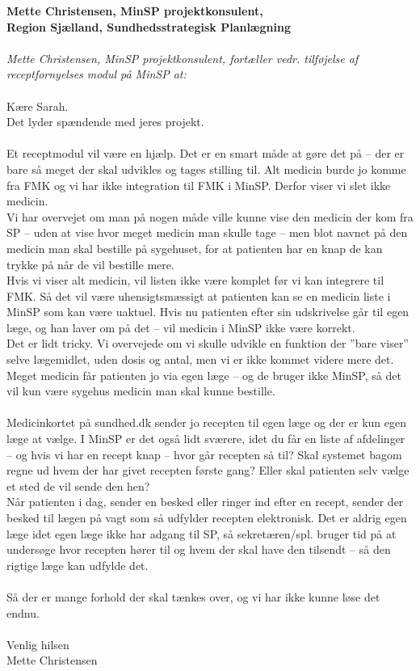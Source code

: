 \textbf{Mette Christensen, MinSP projektkonsulent, \\
	Region Sjælland, Sundhedsstrategisk Planlægning}\\\\
\textit{Mette Christensen, MinSP projektkonsulent, fortæller vedr. tilføjelse af receptfornyelses modul på MinSP at:}\\\\
Kære Sarah.\\
Det lyder spændende med jeres projekt.\\\\
Et receptmodul vil være en hjælp. Det er en smart måde at gøre det på – der er bare så meget der skal udvikles og tages stilling til. Alt medicin burde jo komme fra FMK og vi har ikke integration til FMK i MinSP. Derfor viser vi slet ikke medicin.
\\
Vi har overvejet om man på nogen måde ville kunne vise den medicin der kom fra SP – uden at vise hvor meget medicin man skulle tage – men blot navnet på den medicin man skal bestille på sygehuset, for at patienten har en knap de kan trykke på når de vil bestille mere.
\\
Hvis vi viser alt medicin, vil listen ikke være komplet før vi kan integrere til FMK. Så det vil være uhensigtsmæssigt at patienten kan se en medicin liste i MinSP som kan være uaktuel. Hvis nu patienten efter sin udskrivelse går til egen læge, og han laver om på det – vil medicin i MinSP ikke være korrekt.
\\
Det er lidt tricky. Vi overvejede om vi skulle udvikle en funktion der ”bare viser” selve lægemidlet, uden dosis og antal, men vi er ikke kommet videre mere det.  
\\
Meget medicin får patienten jo via egen læge – og de bruger ikke MinSP, så det vil kun være sygehus medicin man skal kunne bestille.
\\\\
Medicinkortet på sundhed.dk sender jo recepten til egen læge og der er kun egen læge at vælge. I MinSP er det også lidt sværere, idet du får en liste af afdelinger – og hvis vi har en recept knap – hvor går recepten så til? Skal systemet bagom regne ud hvem der har givet recepten første gang? Eller skal patienten selv vælge et sted de vil sende den hen?\\
Når patienten i dag, sender en besked eller ringer ind efter en recept, sender der besked til lægen på vagt som så udfylder recepten elektronisk. Det er aldrig egen læge idet egen læge ikke har adgang til SP, så sekretæren/spl. bruger tid på at undersøge hvor recepten hører til og hvem der skal have den tilsendt – så den rigtige læge kan udfylde det.\\\\
Så der er mange forhold der skal tænkes over, og vi har ikke kunne løse det endnu.\\\\
Venlig hilsen\\
Mette Christensen


